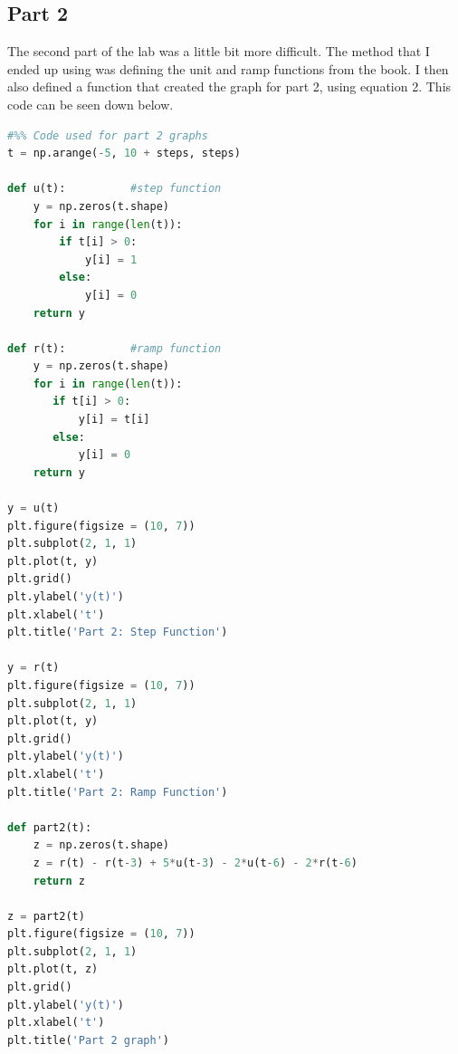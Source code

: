 \documentclass[12pt]{report}
\begin{document}
\subsection{Part 2}
The second part of the lab was a little bit more difficult. The
method that I ended up using was defining the unit and ramp functions from the book. I then also defined a function that created
the graph for part 2, using equation 2. This code can be seen down below.
\begin{lstlisting}[language=Python]
#%% Code used for part 2 graphs
t = np.arange(-5, 10 + steps, steps)

def u(t):          #step function
    y = np.zeros(t.shape)
    for i in range(len(t)):
        if t[i] > 0:
            y[i] = 1
        else:
            y[i] = 0
    return y

def r(t):          #ramp function
    y = np.zeros(t.shape)
    for i in range(len(t)):
       if t[i] > 0:
           y[i] = t[i]
       else:
           y[i] = 0
    return y

y = u(t)   
plt.figure(figsize = (10, 7))
plt.subplot(2, 1, 1)
plt.plot(t, y)
plt.grid()
plt.ylabel('y(t)')
plt.xlabel('t')
plt.title('Part 2: Step Function')

y = r(t)   
plt.figure(figsize = (10, 7))
plt.subplot(2, 1, 1)
plt.plot(t, y)
plt.grid()
plt.ylabel('y(t)')
plt.xlabel('t')
plt.title('Part 2: Ramp Function')

def part2(t):
    z = np.zeros(t.shape)
    z = r(t) - r(t-3) + 5*u(t-3) - 2*u(t-6) - 2*r(t-6)
    return z

z = part2(t)   
plt.figure(figsize = (10, 7))
plt.subplot(2, 1, 1)
plt.plot(t, z)
plt.grid()
plt.ylabel('y(t)')
plt.xlabel('t')
plt.title('Part 2 graph')
\end{lstlisting}
\end{document}
